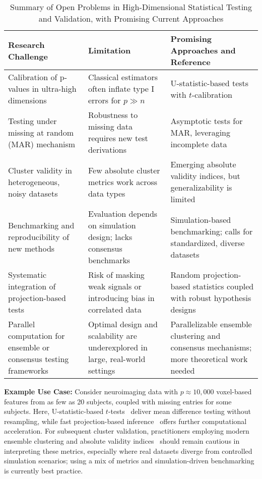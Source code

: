 \documentclass[sigconf]{acmart}
\begin{document}
\begin{table*}[htbp]
\centering
\caption{Summary of Open Problems in High-Dimensional Statistical Testing and Validation, with Promising Current Approaches}
\label{tab:open_problems_high_dim}
\begin{adjustbox}{max width=\textwidth}
\begin{tabular}{@{}lll@{}}
\toprule
Research Challenge & Limitation & Promising Approaches and Reference \\
\midrule
Calibration of p-values in ultra-high dimensions & Classical estimators often inflate type I errors for $p \gg n$ & U-statistic-based tests with $t$-calibration~\cite{ref95} \\
Testing under missing at random (MAR) mechanism & Robustness to missing data requires new test derivations & Asymptotic tests for MAR, leveraging incomplete data~\cite{ref94} \\
Cluster validity in heterogeneous, noisy datasets & Few absolute cluster metrics work across data types & Emerging absolute validity indices, but generalizability is limited~\cite{ref113} \\
Benchmarking and reproducibility of new methods & Evaluation depends on simulation design; lacks consensus benchmarks & Simulation-based benchmarking; calls for standardized, diverse datasets~\cite{ref93,ref95} \\
Systematic integration of projection-based tests & Risk of masking weak signals or introducing bias in correlated data & Random projection-based statistics coupled with robust hypothesis designs~\cite{ref91,ref92,ref93} \\
Parallel computation for ensemble or consensus testing frameworks & Optimal design and scalability are underexplored in large, real-world settings & Parallelizable ensemble clustering and consensus mechanisms; more theoretical work needed~\cite{ref95} \\
\bottomrule
\end{tabular}
\end{adjustbox}
\end{table*}

\noindent
\textbf{Example Use Case:} Consider neuroimaging data with $p \approx 10,000$ voxel-based features from as few as 20 subjects, coupled with missing entries for some subjects. Here, U-statistic-based $t$-tests~\cite{ref95} deliver mean difference testing without resampling, while fast projection-based inference~\cite{ref91,ref92} offers further computational acceleration. For subsequent cluster validation, practitioners employing modern ensemble clustering and absolute validity indices~\cite{ref113} should remain cautious in interpreting these metrics, especially where real datasets diverge from controlled simulation scenarios; using a mix of metrics and simulation-driven benchmarking is currently best practice.
\end{document}
